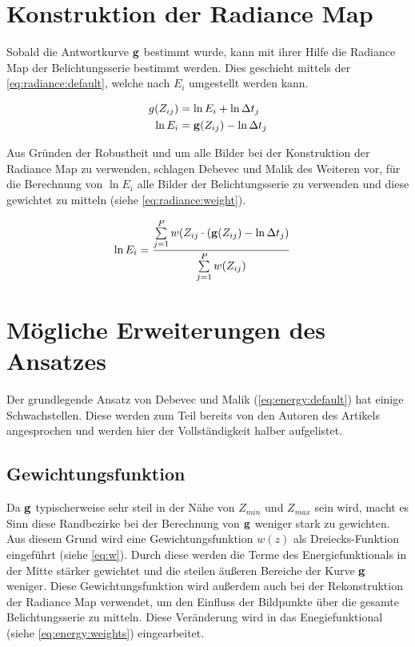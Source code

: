 \section{Konstruktion der Radiance Map}
\label{sec:algo:radiance}
Sobald die Antwortkurve $\mathbf g$ bestimmt wurde, kann mit ihrer Hilfe die \gls{Radiance Map} der Belichtungsserie bestimmt werden. Dies geschieht mittels der \autoref{eq:radiance:default}, welche nach $E_i$ umgestellt werden kann. 

\begin{align}
\label{eq:radiance:default}
g(Z_{ij}) &= \ln E_i + \ln \Delta t_j\\
\ln E_i &= \mathbf g(Z_{ij})-\ln \Delta t_j
\end{align}

Aus Gründen der Robustheit und um alle Bilder bei der Konstruktion der \gls{Radiance Map} zu verwenden, schlagen Debevec und Malik des Weiteren vor, für die Berechnung von $\ln E_i$ alle Bilder der Belichtungsserie zu verwenden und diese gewichtet zu mitteln (siehe \autoref{eq:radiance:weight}).


\begin{align}
\label{eq:radiance:weight}
\ln E_i &= \frac{\sum \limits_{j=1}^P w(Z_{ij} \cdot (\mathbf g(Z_{ij})-\ln \Delta t_j)}{\sum \limits_{j=1}^P w(Z_{ij})}
\end{align}

\section{Mögliche Erweiterungen des Ansatzes}
\label{algo:schwachstellen}
Der grundlegende Ansatz von Debevec und Malik (\autoref{eq:energy:default}) hat einige Schwachstellen. Diese werden zum Teil bereits von den Autoren des Artikels angesprochen und werden hier der Vollständigkeit halber aufgelistet.

\subsection{Gewichtungsfunktion}
\label{algo:schwachstellen:gewichtung}
Da $\mathbf g$ typischerweise sehr steil in der Nähe von $Z_{min}$ und $Z_{max}$ sein wird, macht es Sinn diese Randbezirke bei der Berechnung von $\mathbf g$ weniger stark zu gewichten. Aus diesem Grund wird eine Gewichtungsfunktion $w(z)$ als Dreiecks-Funktion eingeführt (siehe \autoref{eq:w}). 
Durch diese werden die Terme des Energiefunktionals in der Mitte stärker gewichtet und die steilen äußeren Bereiche der Kurve $\mathbf g$ weniger. Diese Gewichtungsfunktion wird außerdem auch bei der Rekonstruktion der \gls{Radiance Map} verwendet, um den Einfluss der Bildpunkte über die gesamte Belichtungsserie zu mitteln. Diese Veränderung wird in das Enegiefunktional (siehe \autoref{eq:energy:weights}) eingearbeitet.

